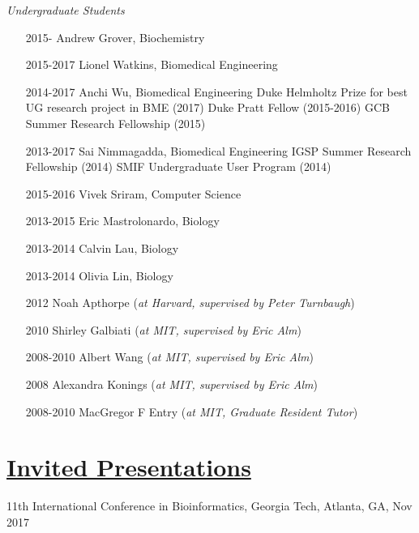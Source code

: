 \documentclass[overlapped,line,11pt]{res}
\begin{document}
\begin{resume}
\vspace{-.1in}
\emph{Undergraduate Students}
\vspace{.1in}
\begin{itemize}[leftmargin=2cm, style=sameline, itemsep=0mm]

\item[2015-] Andrew Grover, Biochemistry 
\item[2015-2017] Lionel Watkins, Biomedical Engineering 
\item[2014-2017] Anchi Wu, Biomedical Engineering \newline 
  Duke Helmholtz Prize for best UG research project in BME (2017) \newline
  Duke Pratt Fellow (2015-2016) \newline
  GCB Summer Research Fellowship (2015) 
\item[2013-2017] Sai Nimmagadda, Biomedical Engineering \newline
  IGSP Summer Research Fellowship (2014) \newline
  SMIF Undergraduate User Program (2014)
\item[2015-2016] Vivek Sriram, Computer Science
\item[2013-2015] Eric Mastrolonardo, 
  Biology 
\item[2013-2014] Calvin Lau, Biology 
\item[2013-2014] Olivia Lin, Biology
\item[2012] Noah Apthorpe (\emph{at Harvard, supervised by Peter Turnbaugh})
\item[2010] Shirley Galbiati (\emph{at MIT, supervised by Eric Alm})
\item[2008-2010] Albert Wang (\emph{at MIT, supervised by Eric Alm})
\item[2008] Alexandra Konings (\emph{at MIT, supervised by Eric Alm})
\item[2008-2010] MacGregor F Entry (\emph{at MIT, Graduate Resident Tutor})
\end{itemize}

\section{\underline{\sc Invited Presentations}}
\vspace{.25in}

\begin{revnumerate}[57]

\item {11th International Conference in Bioinformatics, Georgia Tech, Atlanta, GA, Nov 2017}


\end{revnumerate}
\end{resume}
\end{document}
